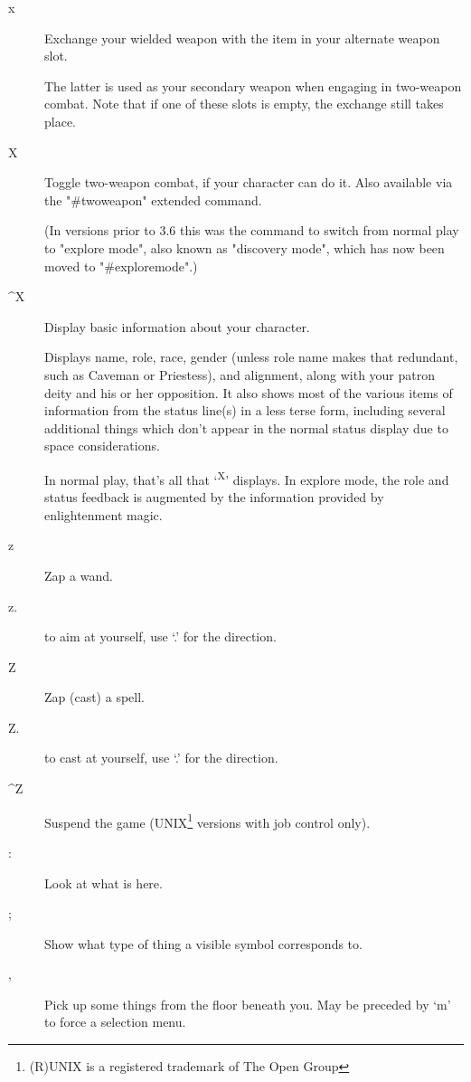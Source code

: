 \documentclass[11pt]{article}
\begin{document}
\begin{description}
\item[{x}] Exchange your wielded weapon with the item in your alternate
weapon slot. 

The latter is used as your secondary weapon when engaging in
 two-weapon combat. Note that if one of these slots is empty, the
 exchange still takes place.

\item[{X}] Toggle two-weapon combat, if your character can do it. Also
available via the "\#twoweapon" extended command. 

(In versions prior to 3.6 this was the command to switch from normal
 play to "explore mode", also known as "discovery mode", which has
 now been moved to "\#exploremode".)

\item[{\^{}X}] Display basic information about your character.

Displays name, role, race, gender (unless role name makes that
 redundant, such as Caveman or Priestess), and alignment, along with
 your patron deity and his or her opposition. It also shows most of
 the various items of information from the status line(s) in a less
 terse form, including several additional things which don't appear
 in the normal status display due to space considerations. 

In normal play, that's all that `\textsuperscript{X}' displays. In explore mode, the
 role and status feedback is augmented by the information provided by
 enlightenment magic.

\item[{z}] Zap a wand.

\item[{z.}] to aim at yourself, use `.' for the direction.

\item[{Z}] Zap (cast) a spell.

\item[{Z.}] to cast at yourself, use `.' for the direction.

\item[{\^{}Z}] Suspend the game (UNIX\footnote{(R)UNIX is a registered trademark of The Open Group} versions with job control only).

\item[{:}] Look at what is here.

\item[{;}] Show what type of thing a visible symbol corresponds to.

\item[{,}] Pick up some things from the floor beneath you. May be preceded
by `m' to force a selection menu.


\end{description}
\end{document}
